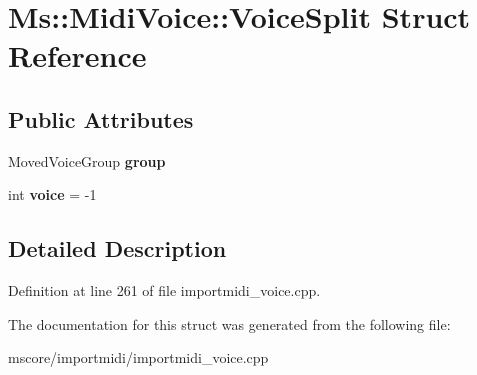\hypertarget{struct_ms_1_1_midi_voice_1_1_voice_split}{}\section{Ms\+:\+:Midi\+Voice\+:\+:Voice\+Split Struct Reference}
\label{struct_ms_1_1_midi_voice_1_1_voice_split}
\subsection*{Public Attributes}
\begin{DoxyCompactItemize}
\item 
\mbox{\label{struct_ms_1_1_midi_voice_1_1_voice_split_a5f558c394196fe4ad71d70b72cda9797}} 
Moved\+Voice\+Group {\bfseries group}
\item 
\mbox{\label{struct_ms_1_1_midi_voice_1_1_voice_split_a1997c074df17ec7db89b471eb37435b6}} 
int {\bfseries voice} = -\/1
\end{DoxyCompactItemize}


\subsection{Detailed Description}


Definition at line 261 of file importmidi\+\_\+voice.\+cpp.



The documentation for this struct was generated from the following file\+:\begin{DoxyCompactItemize}
\item 
mscore/importmidi/importmidi\+\_\+voice.\+cpp\end{DoxyCompactItemize}
